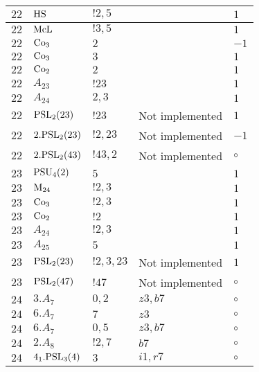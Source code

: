 \documentclass[a4paper, 11pt]{article}
\begin{document}
\begin{longtable}{lllll}
        $ 22 $ & $ {\rm HS} $ & $ ! 2,5 $ & $ ~ $ & $ 1$ \\ \hline
        $ 22 $ & $ {\rm McL} $ & $ ! 3,5 $ & $ ~ $ & $ 1$ \\ \hline
        $ 22 $ & $ {\rm Co}_3 $ & $ 2 $ & $ ~ $ & $ -1$ \\ \hline
        $ 22 $ & $ {\rm Co}_3 $ & $ 3 $ & $ ~ $ & $ 1$ \\ \hline
        $ 22 $ & $ {\rm Co}_2 $ & $ 2 $ & $ ~ $ & $ 1$ \\ \hline
        $ 22 $ & $ A_{23} $ & $ !23 $ & $ ~ $ & $ 1$ \\ \hline
        $ 22 $ & $ A_{24} $ & $ 2, 3 $ & $ ~ $ & $ 1$ \\ \hline
        $ 22 $ & $ {\rm PSL}_{2}(23) $ & $ !23 $ &  Not implemented & $ 1$ \\ \hline
        $ 22 $ & $ 2.{\rm PSL}_{2}(23) $ & $ !2, 23 $ &  Not implemented & $ -1$ \\ \hline
        $ 22 $ & $ 2.{\rm PSL}_{2}(43) $ & $ !43, 2 $ &  Not implemented &  $\circ$ \\ \hline
        $ 23 $ & $ {\rm PSU}_{4}(2) $ & $ 5 $ & $ ~ $ & $ 1$ \\ \hline
        $ 23 $ & $ {\rm M}_{24} $ & $ ! 2,3 $ & $ ~ $ & $ 1$ \\ \hline
        $ 23 $ & $ {\rm Co}_3 $ & $ ! 2,3 $ & $ ~ $ & $ 1$ \\ \hline
        $ 23 $ & $ {\rm Co}_2 $ & $ ! 2 $ & $ ~ $ & $ 1$ \\ \hline
        $ 23 $ & $ A_{24} $ & $ !2, 3 $ & $ ~ $ & $ 1$ \\ \hline
        $ 23 $ & $ A_{25} $ & $ 5 $ & $ ~ $ & $ 1$ \\ \hline
        $ 23 $ & $ {\rm PSL}_{2}(23) $ & $ !2, 3, 23 $ &  Not implemented & $ 1$ \\ \hline
        $ 23 $ & $ {\rm PSL}_{2}(47) $ & $ !47 $ &  Not implemented &  $\circ$ \\ \hline
        $ 24 $ & $ 3.A_{7} $ & $ 0,2 $ & $ z3, b7 $ &  $\circ$ \\ \hline
        $ 24 $ & $ 6.A_{7} $ & $ 7 $ & $ z3 $ &  $\circ$ \\ \hline
        $ 24 $ & $ 6.A_{7} $ & $ 0,5 $ & $ z3, b7 $ &  $\circ$ \\ \hline
        $ 24 $ & $ 2.A_{8} $ & $ ! 2,7 $ & $ b7 $ &  $\circ$ \\ \hline
        $ 24 $ & $ 4_1.{\rm PSL}_{3}(4) $ & $ 3 $ & $ i1, r7 $ &  $\circ$ \\ \hline

\end{longtable}
\end{document}

